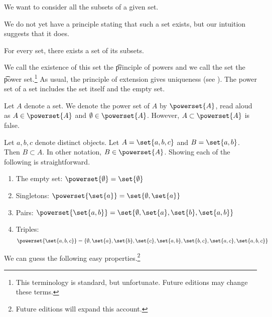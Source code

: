 

We want to consider all the subsets of a given set.


We do not yet have a principle stating that such a set exists, but our intuition suggests that it does.

\begin{principle}[Powers]
  For every set, there exists a set of its subsets.
\end{principle}

We call the existence of this set the \t{principle of powers} and we call the set the \t{power set}.\footnote{This terminology is standard, but unfortunate. Future editions may change these terms.}
As usual, the principle of extension gives uniqueness (see ).
The power set of a set includes the set itself and the empty set.


Let $A$ denote a set.
We denote the power set of $A$ by $\powerset{A}$, read aloud as 
$A \in \powerset{A}$ and $\emptyset \in \powerset{A}$.
However, $A \subset \powerset{A}$ is false.


Let $a, b, c$ denote distinct objects. Let $A = \set{a, b ,c}$
and $B = \set{a, b}$. Then
$B \subset A$.
In other notation,
$B \in \powerset{A}$.
Showing each of the following is straightforward.
\begin{enumerate}
  \item The empty set:  $\powerset{\emptyset} = \set{\emptyset}$
  \item Singletons: $\powerset{\set{a}} = \set{\emptyset, \set{a}}$
  \item Pairs: $\powerset{\set{a, b}} = \set{\emptyset, \set{a}, \set{b}, \set{a, b}}$
  \item Triples:   \[\powerset{\set{a, b, c}} =
  \{
    \emptyset,
    \set{a},
    \set{b},
    \set{c},
    \set{a, b},
    \set{b, c},
    \set{a, c},
    \set{a, b, c}
  \}\]
\end{enumerate}


We can guess the following easy properties.\footnote{Future editions will expand this account.}

